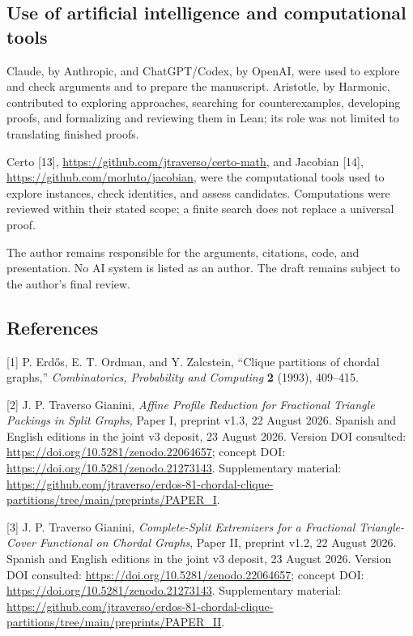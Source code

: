 \documentclass[english,11pt,a4paper]{article}
\begin{document}
\subsection{Use of artificial intelligence and computational tools}\label{use-of-artificial-intelligence-and-computational-tools}

Claude, by Anthropic, and ChatGPT/Codex, by OpenAI, were used to explore and check arguments and to prepare the manuscript. Aristotle, by Harmonic, contributed to exploring approaches, searching for counterexamples, developing proofs, and formalizing and reviewing them in Lean; its role was not limited to translating finished proofs.

Certo {[}13{]}, \url{https://github.com/jtraverso/certo-math}, and Jacobian {[}14{]}, \url{https://github.com/morluto/jacobian}, were the computational tools used to explore instances, check identities, and assess candidates. Computations were reviewed within their stated scope; a finite search does not replace a universal proof.

The author remains responsible for the arguments, citations, code, and presentation. No AI system is listed as an author. The draft remains subject to the author's final review.

\clearpage
\subsection{References}
\begingroup\small\setlength{\parskip}{4pt}\label{references}

{[}1{]} P. Erdős, E. T. Ordman, and Y. Zalcstein, ``Clique partitions of chordal graphs,'' \emph{Combinatorics, Probability and Computing} \textbf{2} (1993), 409--415.

{[}2{]} J. P. Traverso Gianini, \emph{Affine Profile Reduction for Fractional Triangle Packings in Split Graphs}, Paper I, preprint v1.3, 22 August 2026. Spanish and English editions in the joint v3 deposit, 23 August 2026. Version DOI consulted: \url{https://doi.org/10.5281/zenodo.22064657}; concept DOI: \url{https://doi.org/10.5281/zenodo.21273143}. Supplementary material: \url{https://github.com/jtraverso/erdos-81-chordal-clique-partitions/tree/main/preprints/PAPER_I}.

{[}3{]} J. P. Traverso Gianini, \emph{Complete-Split Extremizers for a Fractional Triangle-Cover Functional on Chordal Graphs}, Paper II, preprint v1.2, 22 August 2026. Spanish and English editions in the joint v3 deposit, 23 August 2026. Version DOI consulted: \url{https://doi.org/10.5281/zenodo.22064657}; concept DOI: \url{https://doi.org/10.5281/zenodo.21273143}. Supplementary material: \url{https://github.com/jtraverso/erdos-81-chordal-clique-partitions/tree/main/preprints/PAPER_II}.
\end{document}
